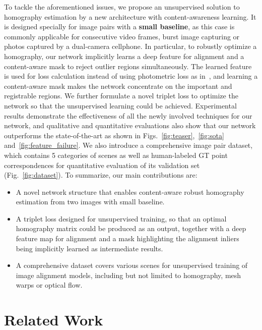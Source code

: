\documentclass[runningheads]{llncs}
\begin{document}
To tackle the aforementioned issues, we propose an unsupervised solution to homography estimation by a new architecture with content-awareness learning. It is designed specially for image pairs with a \textbf{small baseline}, as this case is commonly applicable for consecutive video frames, burst image capturing or photos captured by a dual-camera cellphone. In particular, to robustly optimize a homography, our network implicitly learns a deep feature for alignment and a content-aware mask to reject outlier regions simultaneously. The learned feature is used for loss calculation instead of using photometric loss as in~\cite{detone2016deep}, {\color{black}and learning a content-aware mask makes the network concentrate on the important and registrable regions.} We further formulate a novel triplet loss to optimize the network so that the unsupervised learning could be achieved. Experimental results demonstrate the effectiveness of all the newly involved techniques for our network, and qualitative and quantitative evaluations also show that our network outperforms the state-of-the-art as shown in Figs.~\ref{fig:teaser},~\ref{fig:sota} and~\ref{fig:feature_failure}. We also introduce a comprehensive image pair dataset, which contains 5 categories of scenes as well as human-labeled GT point correspondences for quantitative evaluation of its validation set (Fig.~\ref{fig:dataset}). To summarize, our main contributions are:
\begin{itemize}
  \item A novel network structure that enables content-aware robust homography estimation from two images with small baseline.
  \item A triplet loss designed for unsupervised training, so that an optimal homography matrix could be produced as an output, together with a deep feature map for alignment and a mask highlighting the alignment inliers being implicitly learned as intermediate results.
  \item A comprehensive dataset covers various scenes for unsupervised training of image alignment models, including but not limited to homography, mesh warps or optical flow.
\end{itemize}



\section{Related Work}\label{sec:related}
\end{document}
